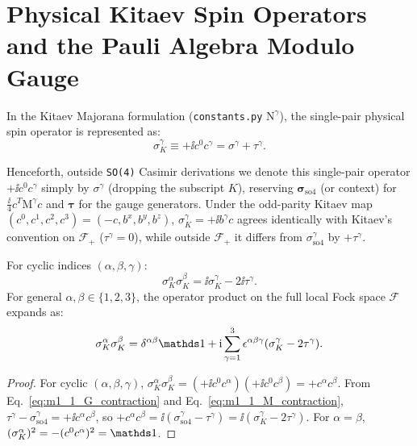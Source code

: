 \section{Physical Kitaev Spin Operators and the Pauli Algebra Modulo Gauge}
\label{sec:m1_1_pauli_algebra}
In the Kitaev Majorana formulation (\texttt{constants.py} $\mathrm{N}^\gamma$), the single-pair physical spin operator is represented as:
\begin{equation}
\label{eq:m1_1_pauli_def}
\sigma_K^\gamma \equiv +\ii c^0 c^\gamma = \sigma^\gamma + \tau^\gamma.
\end{equation}
\begin{remark}
\label{rem:m1_1_notation_spin_operators}
Henceforth, outside \texttt{SO(4)} Casimir derivations we denote this single-pair operator $+\ii c^0 c^\gamma$ simply by $\sigma^\gamma$ (dropping the subscript $K$), reserving $\bm{\sigma}_{\mathrm{so4}}$ (or context) for $\frac{\ii}{4}c^T \mathrm{M}^\gamma c$ and $\bm{\tau}$ for the gauge generators. Under the odd-parity Kitaev map $(c^0, c^1, c^2, c^3) = (-c, b^x, b^y, b^z)$, $\sigma_K^\gamma = +\ii b^\gamma c$ agrees identically with Kitaev's convention on $\mathcal{F}_+$ ($\tau^\gamma = 0$), while outside $\mathcal{F}_+$ it differs from $\sigma_{\mathrm{so4}}^\gamma$ by $+\tau^\gamma$.
\end{remark}

\begin{proposition}
\label{prop:m1_1_pauli_modulo_gauge}
For cyclic indices $(\alpha, \beta, \gamma)$:
\begin{equation}
\label{eq:m1_1_pauli_cyclic}
\sigma_K^\alpha \sigma_K^\beta = \ii \sigma_K^\gamma - 2\ii \tau^\gamma.
\end{equation}
For general $\alpha, \beta \in \{1, 2, 3\}$, the operator product on the full local Fock space $\mathcal{F}$ expands as:
\begin{equation}
\label{eq:m1_1_pauli_general}
\sigma_K^\alpha \sigma_K^\beta = \delta^{\alpha\beta}\Id + \ii \sum_{\gamma=1}^3 \epsilon^{\alpha\beta\gamma}(\sigma_K^\gamma - 2 \tau^\gamma).
\end{equation}
\end{proposition}
\begin{proof}
For cyclic $(\alpha, \beta, \gamma)$, $\sigma_K^\alpha \sigma_K^\beta = (+\ii c^0 c^\alpha)(+\ii c^0 c^\beta) = +c^\alpha c^\beta$. From Eq.~\eqref{eq:m1_1_G_contraction} and Eq.~\eqref{eq:m1_1_M_contraction}, $\tau^\gamma - \sigma_{\mathrm{so4}}^\gamma = +\ii c^\alpha c^\beta$, so $+c^\alpha c^\beta = \ii(\sigma_{\mathrm{so4}}^\gamma - \tau^\gamma) = \ii(\sigma_K^\gamma - 2\tau^\gamma)$. For $\alpha = \beta$, $(\sigma_K^\alpha)^2 = -(c^0 c^\alpha)^2 = \Id$.
\end{proof}

